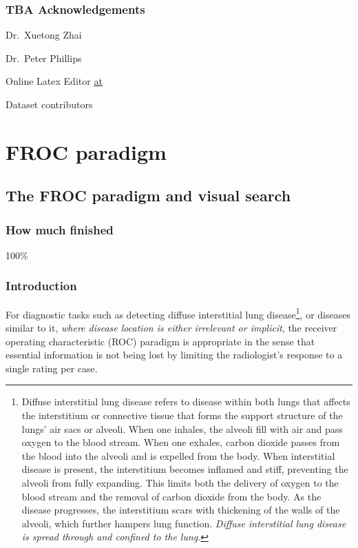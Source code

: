 \documentclass[
]{book}
\begin{document}
\hypertarget{tba-acknowledgements}{%
\section{TBA Acknowledgements}\label{tba-acknowledgements}}

Dr.~Xuetong Zhai

Dr.~Peter Phillips

Online Latex Editor \href{https://latexeditor.lagrida.com/}{at}

Dataset contributors

\hypertarget{part-froc-paradigm}{%
\part*{FROC paradigm}\label{part-froc-paradigm}}

\hypertarget{froc-paradigm}{%
\chapter{The FROC paradigm and visual search}\label{froc-paradigm}}

\hypertarget{froc-paradigm-how-much-finished}{%
\section{How much finished}\label{froc-paradigm-how-much-finished}}

100\%

\hypertarget{froc-paradigm-intro}{%
\section{Introduction}\label{froc-paradigm-intro}}

For diagnostic tasks such as detecting diffuse interstitial lung disease\footnote{Diffuse interstitial lung disease refers to disease within both lungs that affects the interstitium or connective tissue that forms the support structure of the lungs' air sacs or alveoli. When one inhales, the alveoli fill with air and pass oxygen to the blood stream. When one exhales, carbon dioxide passes from the blood into the alveoli and is expelled from the body. When interstitial disease is present, the interstitium becomes inflamed and stiff, preventing the alveoli from fully expanding. This limits both the delivery of oxygen to the blood stream and the removal of carbon dioxide from the body. As the disease progresses, the interstitium scars with thickening of the walls of the alveoli, which further hampers lung function. \emph{Diffuse interstitial lung disease is spread through and confined to the lung}.}, or diseases similar to it, \emph{where disease location is either irrelevant or implicit}, the receiver operating characteristic (ROC) paradigm is appropriate in the sense that essential information is not being lost by limiting the radiologist's response to a single rating per case.
\end{document}
